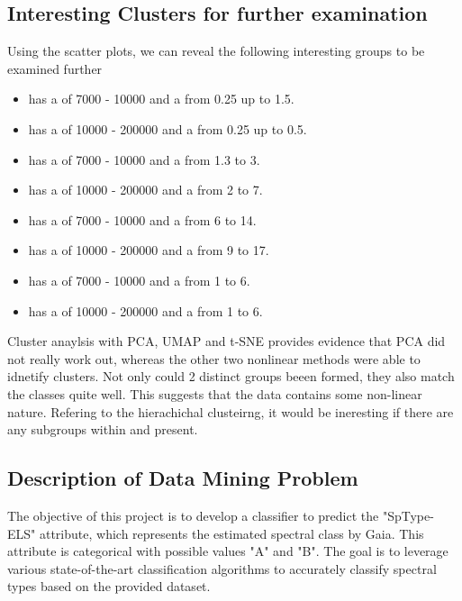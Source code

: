 \subsection{Interesting Clusters for further examination}
\label{subsection:interesting_clusters_for_further_examination}

Using the scatter plots, we can reveal the following interesting groups to be examined further
\begin{itemize}
    \item \gra has a  of 7000 - 10000 and a  from 0.25 up to 1.5.
    \item \grb has a  of 10000 - 200000 and a  from 0.25 up to 0.5.

    \item \gra has a  of 7000 - 10000 and a  from 1.3 to 3.
    \item \grb has a  of 10000 - 200000 and a  from 2 to 7.

    \item \gra has a  of 7000 - 10000 and a  from 6 to 14.
    \item \grb has a  of 10000 - 200000 and a  from 9 to 17.

    \item \gra has a  of 7000 - 10000 and a  from 1 to 6.
    \item \grb has a  of 10000 - 200000 and a  from 1 to 6.
\end{itemize}

Cluster anaylsis with PCA, UMAP and t-SNE provides evidence that PCA did not really work out, whereas the other two nonlinear methods were able to idnetify clusters. Not only could 2 distinct groups beeen formed, they also match the classes quite well. This suggests that the data contains some non-linear nature. Refering to the hierachichal clusteirng, it would be ineresting if there are any subgroups within \gra and \grb present.



\subsection{Description of Data Mining Problem}
The objective of this project is to develop a classifier to predict the "SpType-ELS" attribute, which represents the estimated spectral class by Gaia. This attribute is categorical with possible values "A" and "B". The goal is to leverage various state-of-the-art classification algorithms to accurately classify spectral types based on the provided dataset.

